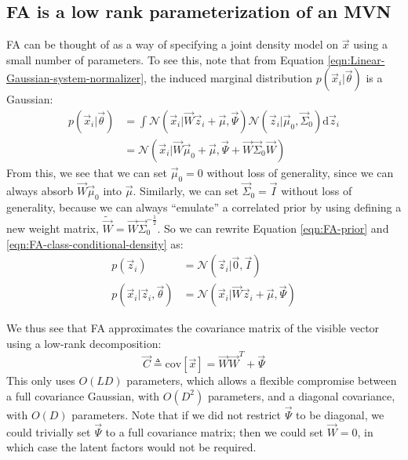 \subsection{FA is a low rank parameterization of an MVN}
FA can be thought of as a way of specifying a joint density model on $\vec{x}$ using a small number of parameters. To see this, note that from Equation \ref{eqn:Linear-Gaussian-system-normalizer}, the induced marginal distribution $p(\vec{x}_i|\vec{\theta})$ is a Gaussian:
\begin{align}
p(\vec{x}_i|\vec{\theta}) & = \int \mathcal{N}(\vec{x}_i|\vec{W}\vec{z}_i+\vec{\mu},\vec{\Psi})\mathcal{N}(\vec{z}_i|\vec{\mu}_0,\vec{\Sigma}_0)\mathrm{d}\vec{z}_i \nonumber \\
 & = \mathcal{N}(\vec{x}_i|\vec{W}\vec{\mu}_0+\vec{\mu},\vec{\Psi}+\vec{W}\vec{\Sigma}_0\vec{W})
\end{align}
From this, we see that we can set $\vec{\mu}_0=0$ without loss of generality, since we can always absorb $\vec{W}\vec{\mu}_0$ into $\vec{\mu}$. Similarly, we can set $\vec{\Sigma}_0=\vec{I}$ without loss of generality, because we can always “emulate” a correlated prior by using defining a new weight matrix, $\tilde{\vec{W}}=\vec{W}\vec{\Sigma}_0^{-\frac{1}{2}}$. So we can rewrite Equation \ref{eqn:FA-prior} and \ref{eqn:FA-class-conditional-density} as:
\begin{align}
p(\vec{z}_i)&=\mathcal{N}(\vec{z}_i|\vec{0},\vec{I}) \\
p(\vec{x}_i|\vec{z}_i,\vec{\theta})&=\mathcal{N}(\vec{x}_i|\vec{W}\vec{z}_i+\vec{\mu},\vec{\Psi})
\end{align}

We thus see that FA approximates the covariance matrix of the visible vector using a low-rank decomposition:
\begin{equation}\label{eqn:FA-prior}
\vec{C} \triangleq \mathrm{cov}[\vec{x}]=\vec{W}\vec{W}^T+\vec{\Psi}
\end{equation}
This only uses $O(LD)$ parameters, which allows a flexible compromise between a full covariance Gaussian, with $O(D^2)$ parameters, and a diagonal covariance, with $O(D)$ parameters. Note that if we did not restrict $\vec{\Psi}$ to be diagonal, we could trivially set $\vec{\Psi}$ to a full covariance matrix; then we could set $\vec{W}=0$, in which case the latent factors would not be required.


